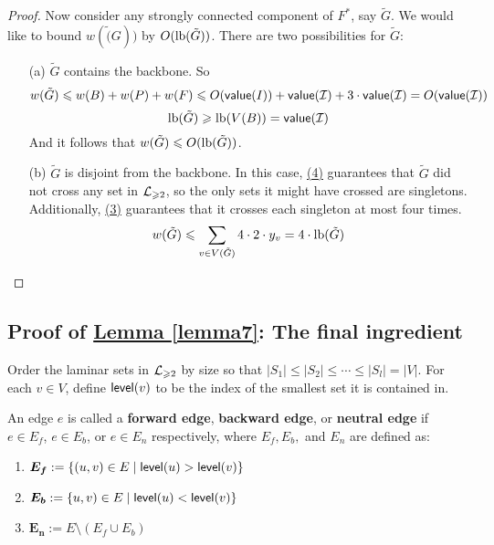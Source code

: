 \documentclass[./main.tex]{subfiles}
\newcommand{\level}{\textsf{\textup{level}}}
\begin{document}
\begin{proof}
			Now consider any strongly connected component of $F^*$, say $\tilde{G}$. We would like to bound $w(\tilde(G))$ by $O(\textup{lb}(\tilde{G}))$. There are two possibilities for $\tilde{G}$:
			\begin{enumerate}
				\item[(a)] $\tilde{G}$ contains the backbone. So $$w(\tilde{G})\leqslant w(B) + w(P) + w(F)\leqslant O(\textsf{\textup{value}}(I)) + \textsf{\textup{value}}(\mathcal{I}) + 3\cdot\textsf{\textup{value}}(\mathcal{I}) = O(\textsf{\textup{value}}(\mathcal{I}))$$
				      $$\textup{lb}(\tilde{G})\geqslant \textup{lb}(V(B)) = \textsf{\textup{value}}(\mathcal{I})$$
				      And it follows that $w(\tilde{G})\leqslant O(\textup{lb}(\tilde{G}))$.

				\item[(b)] $\tilde{G}$ is disjoint from the backbone. In this case, \hyperref[lemm:main:4]{(4)} guarantees that $\tilde{G}$ did not cross any set in $\mathcal{L}_{\geqslant 2}$, so the only sets it might have crossed are singletons. Additionally, \hyperref[lemm:main:3]{(3)} guarantees that it crosses each singleton at most four times.
				\[
					w(\tilde{G})\leqslant \sum_{v\in V(\tilde{G})}4\cdot 2\cdot y_v = 4\cdot\textup{lb}(\tilde{G})
				\]
			\end{enumerate}
		\end{proof}

		\subsection{Proof of \hyperref[lemma7]{Lemma \ref{lemma7}}: The final ingredient}

			Order the laminar sets in $\mathcal{L}_{\geqslant 2}$ by size so that $|S_1|\leqslant |S_2|\leqslant\cdots\leqslant |S_l| = |V|$. For each $v\in V$, define $\level(v)$ to be the index of the smallest set it is contained in.\\
			\begin{definition}
				An edge $e$ is called a \textbf{forward edge}, \textbf{backward edge}, or \textbf{neutral edge} if $e\in E_f$, $e\in E_b$, or $e\in E_n$ respectively, where $E_f, E_b,$ and $E_n$ are defined as:
				\begin{enumerate}[$-$]
					\item $\bm{E_f}:=\{(u,v)\in E\mid \level(u) > \level(v)\}$

					\item $\bm{E_b}:=\{u,v)\in E\mid \level(u) < \level(v)\}$

					\item $\bm{E_n}:=E\setminus (E_f\cup E_b)$\\
				\end{enumerate}
			\end{definition}
\end{document}
